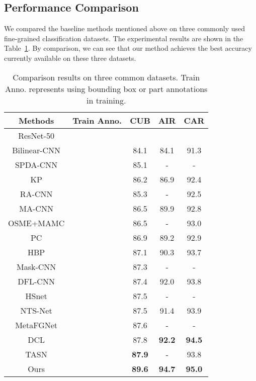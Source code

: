 \documentclass[runningheads]{llncs}
\begin{document}
\subsection{Performance Comparison}
 We compared the baseline methods mentioned above on three commonly used fine-grained classification datasets. The experimental results are shown in the Table~\ref {tb2}. By comparison, we can see that our method achieves the best accuracy currently available on these three datasets.
\begin{table}
\centering
\caption{Comparison results on three common datasets. Train Anno. represents using bounding box or part annotations in training.}\label{tb2}
\begin{tabular}{|c|c|c|c|c|}
	\hline
	Methods & Train Anno. & CUB & AIR & CAR \\
	\hline
	ResNet-50 & & & & \\
	\hline
	Bilinear-CNN \cite{lin2015bilinear} &  & 84.1 & 84.1 & 91.3 \\
	SPDA-CNN \cite{zhang2016spda} & \checkmark & 85.1 & - & - \\
	KP \cite{cui2017kernel} & & 86.2 & 86.9 & 92.4 \\
	RA-CNN \cite{fu2017look} & & 85.3 & - & 92.5 \\
	MA-CNN \cite{zheng2017learning} & & 86.5 & 89.9 & 92.8 \\
	OSME+MAMC \cite{sun2018multi} & & 86.5 & - & 93.0 \\
	PC \cite{dubey2018pairwise} & & 86.9 & 89.2 & 92.9 \\
	HBP \cite{yu2018hierarchical} & & 87.1 & 90.3 & 93.7 \\
	Mask-CNN \cite{wei2016mask} & \checkmark & 87.3 & - & - \\
	DFL-CNN \cite{wang2018learning} & & 87.4 & 92.0 & 93.8 \\
	HSnet \cite{lam2017fine} & \checkmark & 87.5 & - & - \\
	NTS-Net \cite{yang2018learning} & & 87.5 & 91.4 & 93.9 \\
	MetaFGNet \cite{zhang2018fine} & & 87.6 & - & - \\
	DCL \cite{chen2019destruction} & & 87.8 & \textbf{92.2} & \textbf{94.5} \\
	TASN \cite{zheng2019looking} & & \textbf{87.9} & - & 93.8 \\
	\hline
	Ours & & \textbf{89.6} & \textbf{94.7} & \textbf{95.0} \\
	\hline
\end{tabular}
\end{table}
\end{document}
